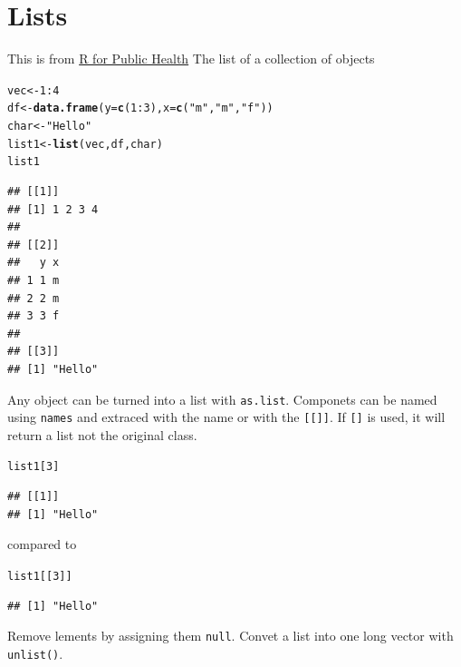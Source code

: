 \documentclass[12pt, a4paper, oneside]{article}\usepackage[]{graphicx}\usepackage[]{color}
\makeatletter
\newcommand{\hlnum}[1]{\textcolor[rgb]{0.686,0.059,0.569}{#1}}%
\newcommand{\hlstr}[1]{\textcolor[rgb]{0.192,0.494,0.8}{#1}}%
\newcommand{\hlopt}[1]{\textcolor[rgb]{0,0,0}{#1}}%
\newcommand{\hlstd}[1]{\textcolor[rgb]{0.345,0.345,0.345}{#1}}%
\newcommand{\hlkwb}[1]{\textcolor[rgb]{0.69,0.353,0.396}{#1}}%
\newcommand{\hlkwc}[1]{\textcolor[rgb]{0.333,0.667,0.333}{#1}}%
\newcommand{\hlkwd}[1]{\textcolor[rgb]{0.737,0.353,0.396}{\textbf{#1}}}%
\newenvironment{kframe}{%
 \def\at@end@of@kframe{}%
 \ifinner\ifhmode%
  \def\at@end@of@kframe{\end{minipage}}%
  \begin{minipage}{\columnwidth}%
 \fi\fi%
 \def\FrameCommand##1{\hskip\@totalleftmargin \hskip-\fboxsep
 \colorbox{shadecolor}{##1}\hskip-\fboxsep
     \hskip-\linewidth \hskip-\@totalleftmargin \hskip\columnwidth}%
 \MakeFramed {\advance\hsize-\width
   \@totalleftmargin\z@ \linewidth\hsize
   \@setminipage}}%
 {\par\unskip\endMakeFramed%
 \at@end@of@kframe}
\newenvironment{knitrout}{}{} %
\makeatother
\begin{document}
\section{Lists}
This is from \href{http://rforpublichealth.blogspot.co.uk/2015/03/basics-of-lists.html}{R for Public Health}
The list of a collection of objects
\begin{knitrout}
\color{fgcolor}\begin{kframe}
\begin{alltt}
\hlstd{vec} \hlkwb{<-} \hlnum{1}\hlopt{:}\hlnum{4}
\hlstd{df} \hlkwb{<-} \hlkwd{data.frame}\hlstd{(}\hlkwc{y} \hlstd{=} \hlkwd{c}\hlstd{(}\hlnum{1}\hlopt{:}\hlnum{3}\hlstd{),} \hlkwc{x} \hlstd{=} \hlkwd{c}\hlstd{(}\hlstr{"m"}\hlstd{,} \hlstr{"m"}\hlstd{,} \hlstr{"f"}\hlstd{))}
\hlstd{char} \hlkwb{<-} \hlstr{"Hello"}
\hlstd{list1} \hlkwb{<-} \hlkwd{list}\hlstd{(vec, df, char)}
\hlstd{list1}
\end{alltt}
\begin{verbatim}
## [[1]]
## [1] 1 2 3 4
## 
## [[2]]
##   y x
## 1 1 m
## 2 2 m
## 3 3 f
## 
## [[3]]
## [1] "Hello"
\end{verbatim}
\end{kframe}
\end{knitrout}
Any object can be turned into a list with \lstinline{as.list}.  Componets can be named using \lstinline{names} and extraced with the name or with the \lstinline{[[]]}.  If \lstinline{[]} is used, it will return a list not the original class. 
\begin{knitrout}
\color{fgcolor}\begin{kframe}
\begin{alltt}
\hlstd{list1[}\hlnum{3}\hlstd{]}
\end{alltt}
\begin{verbatim}
## [[1]]
## [1] "Hello"
\end{verbatim}
\end{kframe}
\end{knitrout}
compared to 
\begin{knitrout}
\color{fgcolor}\begin{kframe}
\begin{alltt}
\hlstd{list1[[}\hlnum{3}\hlstd{]]}
\end{alltt}
\begin{verbatim}
## [1] "Hello"
\end{verbatim}
\end{kframe}
\end{knitrout}
Remove lements by assigning them \lstinline{null}.  Convet a list into one  long vector with \lstinline{unlist()}. 
\end{document}
